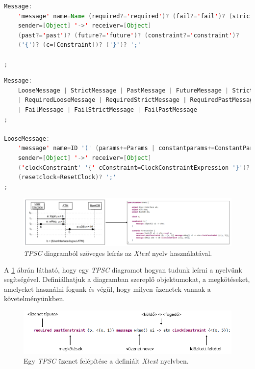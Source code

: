 \begin{lstlisting}[language=java, frame=single, float=ht!, caption={Eredeti \textit{Message} nyelvtani szabály \cite{Bakai}.},captionpos=b,label=minotor_message_original]
Message:
    'message' name=Name (required?='required')? (fail?='fail')? (strict?='strict')?
    sender=[Object] '->' receiver=[Object]
    (past?='past')? (future?='future')? (constraint?='constraint')?
    ('{')? (c=[Constraint])? ('}')? ';'

;
\end{lstlisting}

\begin{lstlisting}[language=java, frame=single, float=ht!, caption={Kibővített \textit{Message} nyelvtani szabály.},captionpos=b,label=minotor_message]
Message:
	LooseMessage | StrictMessage | PastMessage | FutureMessage | StrictFutureMessage
	| RequiredLooseMessage | RequiredStrictMessage | RequiredPastMessage | RequiredFutureMessage | RequiredStrictFutureMessage
	| FailMessage | FailStrictMessage | FailPastMessage
;

LooseMessage:
	'message' name=ID '(' (params+=Params | constantparams+=ConstantParams) ')'
	sender=[Object] '->' receiver=[Object]
	('clockConstraint' '{' cConstraint=ClockConstraintExpression '}')?
	(resetclock=ResetClock)? ';'
;
\end{lstlisting}

\begin{figure}[!ht]
    \centering
    \includegraphics[width=150mm, keepaspectratio]{figures/11abra.png}
    \caption{\textit{TPSC} diagramból szöveges leírás az \textit{Xtext} nyelv használatával.}
    \label{xtext_language_example}
\end{figure}

A \ref{xtext_language_example} ábrán látható, hogy egy \textit{TPSC} diagramot hogyan tudunk leírni a nyelvünk segítségével.
Definiálhatjuk a diagramban szereplő objektumokat, a megkötéseket, amelyeket használni fogunk és végül, hogy milyen üzenetek vannak a követelményünkben.

\begin{figure}[!ht]
    \centering
    \includegraphics[width=150mm, keepaspectratio]{figures/12abra.png}
    \caption{Egy \textit{TPSC} üzenet felépítése a definiált \textit{Xtext} nyelvben.}
    \label{xtext_message}
\end{figure}

